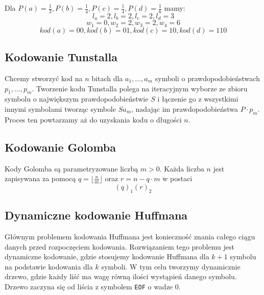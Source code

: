 \documentclass{../notatki}
\begin{document}
Dla $P(a) = \frac{1}{3}, P(b) = \frac{1}{4}, P(c) = \frac{1}{4}, P(d)
= \frac{1}{6}$ mamy:
$$
l_a = 2, l_b = 2, l_c = 2, l_d = 3
$$
$$
w_1 = 0, w_2 = 2, w_3 = 2, w_4 = 6
$$
$$
kod(a) = 00, kod(b) = 01, kod(c) = 10, kod(d) = 110
$$

\subsection{Kodowanie Tunstalla}

Chcemy stworzyć kod na $n$ bitach dla $a_1, \dots, a_m$ symboli o
prawdopodobieństwach $p_1, \dots, p_m$. Tworzenie kodu Tunstalla polega na
iteracyjnym wyborze ze zbioru symbolu o największym prawdopodobieństwie $S$
i łączenie go z wszystkimi innymi symbolami tworząc symbole $Sa_m$, nadając im
prawdopodobieństwa $P \cdot p_m$. Proces ten powtarzamy aż do uzyskania
kodu o długości $n$.

\subsection{Kodowanie Golomba}

Kody Golomba są parametryzowane liczbą $m > 0$. Każda liczba $n$ jest zapisywana
za pomocą $q = \lfloor \frac{n}{m} \rfloor$ oraz $r = n - q \cdot m$ w postaci
$$
(q)_1(r)_2
$$

\subsection{Dynamiczne kodowanie Huffmana}

Głównym problemem kodowania Huffmana jest konieczność znania całego ciągu
danych przed rozpoczęciem kodowania. Rozwiązaniem tego problemu jest
dynamiczne kodowanie, gdzie stosujemy kodowanie Huffmana dla $k + 1$ symbolu
na podstawie kodowania dla $k$ symboli. W tym celu tworzymy dynamicznie drzewo,
gdzie każdy liść ma wagę równą ilości wystąpień danego symbolu. Drzewo zaczyna
się od liścia z symbolem \texttt{EOF} o wadze $0$.

\newcommand{\drawNode}[3]{
  \node[draw] (#1) at (#3) {#2};
  \node[below] at (#1.south) {\texttt{#1}};
}
\end{document}
